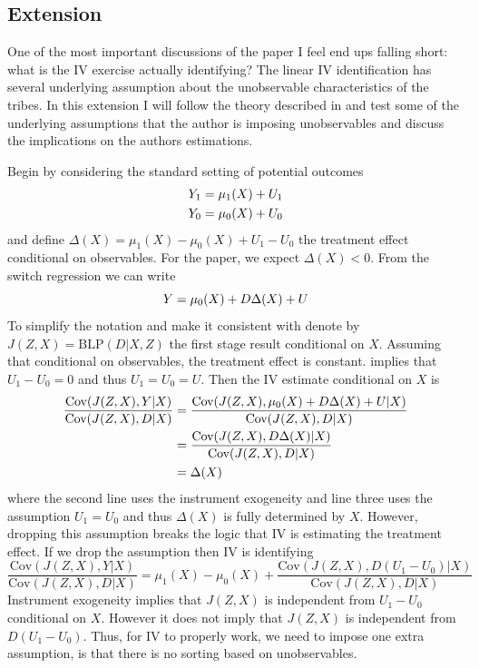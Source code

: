 \subsection*{Extension}
One of the most important discussions of the paper I feel end ups falling short: what is the IV exercise actually identifying? The linear IV identification has several underlying assumption about the unobservable characteristics of the tribes. In this extension I will follow the theory described in \citet{Heckman05} and test some of the underlying assumptions that the author is imposing unobservables and discuss the implications on the authors estimations. 

Begin by considering the standard setting of potential outcomes \vspace{-18pt}
\begin{align*}
    Y_1 &= \mu_1(X) + U_1 \\ 
    Y_0 &= \mu_0(X) + U_0 \vspace{-13pt}
\end{align*}
and define $\Delta(X) = \mu_1(X)-\mu_0(X) + U_1-U_0$ the treatment effect conditional on observables. For the paper, we expect $\Delta(X)<0$. From the switch regression we can write \vspace{-18pt}
\begin{equation*}
    Y = \mu_0(X) + D\Delta(X) + U \vspace{-13pt}
\end{equation*}
To simplify the notation and make it consistent with \citet{Heckman05} denote by $J(Z,X)=\text{BLP}(D\vert X,Z)$ the first stage result conditional on $X$. Assuming that conditional on observables, the treatment effect is constant. implies that $U_1-U_0=0$ and thus $U_1=U_0=U$. Then the IV estimate conditional on $X$ is \vspace{-10pt}
\begin{align*}
    \frac{\text{Cov}(J(Z,X),Y\vert X)}{\text{Cov}(J(Z,X),D\vert X)} &= \frac{\text{Cov}(J(Z,X),\mu_0(X) + D\Delta(X) + U\vert X)}{\text{Cov}(J(Z,X),D\vert X)} \\ 
    &= \frac{\text{Cov}(J(Z,X),D\Delta(X) \vert X)}{\text{Cov}(J(Z,X),D\vert X)} \\
    &= \Delta(X) \vspace{-13pt}
\end{align*}
where the second line uses the instrument exogeneity and line three uses the assumption $U_1=U_0$ and thus $\Delta(X)$ is fully determined by $X$. However, dropping this assumption breaks the logic that IV is estimating the treatment effect. If we drop the assumption then IV is identifying \vspace{-13pt}
\begin{equation*}
    \frac{\text{Cov}(J(Z,X),Y\vert X)}{\text{Cov}(J(Z,X),D\vert X)} = \mu_1(X)-\mu_0(X) + \frac{\text{Cov}(J(Z,X),D(U_1-U_0) \vert X)}{\text{Cov}(J(Z,X),D\vert X)}
\end{equation*}
Instrument exogeneity implies that $J(Z,X)$ is independent from $U_1-U_0$ conditional on $X$. However it does not imply that $J(Z,X)$ is independent from $D(U_1-U_0)$. Thus, for IV to properly work, we need to impose one extra assumption, is that there is no sorting based on unobservables.

